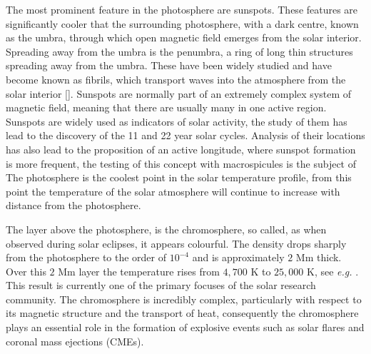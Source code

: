 
The most prominent feature in the photosphere are sunspots.
These features are significantly cooler that the surrounding photosphere, with a dark centre, known as the umbra, through which open magnetic field emerges from the solar interior.
Spreading away from the umbra is the penumbra, a ring of long thin structures spreading away from the umbra.
These have been widely studied and have become known as fibrils, which transport waves into the atmosphere from the solar interior [\cite{Rouppe2013}].
Sunspots are normally part of an extremely complex system of magnetic field, meaning that there are usually many in one active region.
Sunspots are widely used as indicators of solar activity, the study of them has lead to the discovery of the 11 and 22 year solar cycles.
Analysis of their locations has also lead to the proposition of an active longitude, where sunspot formation is more frequent, the testing of this concept with macrospicules is the subject of 
The photosphere is the coolest point in the solar temperature profile, from this point the temperature of the solar atmosphere will continue to increase with distance from the photosphere.

The layer above the photosphere, is the chromosphere, so called, as when observed during solar eclipses, it appears colourful.
The density drops sharply from the photosphere to the order of $10^{-4}$ and is approximately $2$ Mm thick. 
Over this $2$ Mm layer the temperature rises from $4,700$ K to $25,000$ K, see \emph{e.g.} \cite{Withbroe1977}.
This result is currently one of the primary focuses of the solar research community.
The chromosphere is incredibly complex, particularly with respect to its magnetic structure and the transport of heat, consequently the chromosphere plays an essential role in the formation of explosive events such as solar flares and coronal mass ejections (CMEs).

